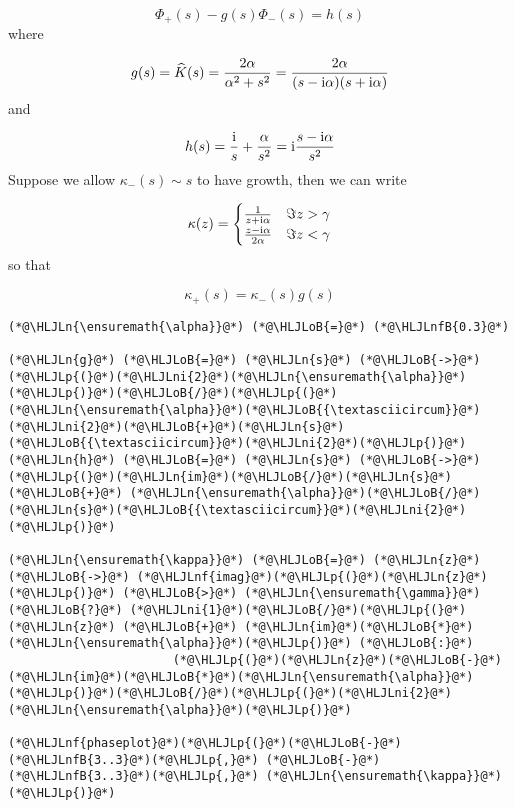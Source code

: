 \documentclass[12pt,landscape]{article}
\newcommand{\HLJLn}[1]{#1}
\newcommand{\HLJLnf}[1]{\textcolor[RGB]{66,102,213}{#1}}
\newcommand{\HLJLnfB}[1]{\textcolor[RGB]{59,151,46}{#1}}
\newcommand{\HLJLni}[1]{\textcolor[RGB]{59,151,46}{#1}}
\newcommand{\HLJLoB}[1]{\textcolor[RGB]{102,102,102}{\textbf{#1}}}
\newcommand{\HLJLp}[1]{#1}
\def\I{ {\rm i} }
\begin{document}
{\[
\Phi_+(s) - g(s) \Phi_-(s) = h(s)
\]
where

\[
g(s) = \widehat K(s) = {2\alpha \over \alpha^2 +s^2}= {2 \alpha \over (s-\I \alpha)(s+\I \alpha)}
\]
and

\[
h(s) = {\I \over s} + {\alpha \over s^2} = \I {s -\I \alpha \over s^2}
\]
Suppose we allow $\kappa_-(s) \sim s$ to have growth, then we can write

\[
\kappa(z) = \begin{cases} {1 \over z+\I \alpha }& \Im z > \gamma \\
                        {z-\I \alpha \over 2 \alpha} & \Im z < \gamma
\end{cases}
\]
so that

\[
\kappa_+(s) = \kappa_-(s) g(s)
\]

\begin{lstlisting}
(*@\HLJLn{\ensuremath{\alpha}}@*) (*@\HLJLoB{=}@*) (*@\HLJLnfB{0.3}@*)

(*@\HLJLn{g}@*) (*@\HLJLoB{=}@*) (*@\HLJLn{s}@*) (*@\HLJLoB{->}@*) (*@\HLJLp{(}@*)(*@\HLJLni{2}@*)(*@\HLJLn{\ensuremath{\alpha}}@*)(*@\HLJLp{)}@*)(*@\HLJLoB{/}@*)(*@\HLJLp{(}@*)(*@\HLJLn{\ensuremath{\alpha}}@*)(*@\HLJLoB{{\textasciicircum}}@*)(*@\HLJLni{2}@*)(*@\HLJLoB{+}@*)(*@\HLJLn{s}@*)(*@\HLJLoB{{\textasciicircum}}@*)(*@\HLJLni{2}@*)(*@\HLJLp{)}@*)
(*@\HLJLn{h}@*) (*@\HLJLoB{=}@*) (*@\HLJLn{s}@*) (*@\HLJLoB{->}@*) (*@\HLJLp{(}@*)(*@\HLJLn{im}@*)(*@\HLJLoB{/}@*)(*@\HLJLn{s}@*) (*@\HLJLoB{+}@*) (*@\HLJLn{\ensuremath{\alpha}}@*)(*@\HLJLoB{/}@*)(*@\HLJLn{s}@*)(*@\HLJLoB{{\textasciicircum}}@*)(*@\HLJLni{2}@*)(*@\HLJLp{)}@*)

(*@\HLJLn{\ensuremath{\kappa}}@*) (*@\HLJLoB{=}@*) (*@\HLJLn{z}@*) (*@\HLJLoB{->}@*) (*@\HLJLnf{imag}@*)(*@\HLJLp{(}@*)(*@\HLJLn{z}@*)(*@\HLJLp{)}@*) (*@\HLJLoB{>}@*) (*@\HLJLn{\ensuremath{\gamma}}@*) (*@\HLJLoB{?}@*) (*@\HLJLni{1}@*)(*@\HLJLoB{/}@*)(*@\HLJLp{(}@*)(*@\HLJLn{z}@*) (*@\HLJLoB{+}@*) (*@\HLJLn{im}@*)(*@\HLJLoB{*}@*)(*@\HLJLn{\ensuremath{\alpha}}@*)(*@\HLJLp{)}@*) (*@\HLJLoB{:}@*)
                       (*@\HLJLp{(}@*)(*@\HLJLn{z}@*)(*@\HLJLoB{-}@*)(*@\HLJLn{im}@*)(*@\HLJLoB{*}@*)(*@\HLJLn{\ensuremath{\alpha}}@*)(*@\HLJLp{)}@*)(*@\HLJLoB{/}@*)(*@\HLJLp{(}@*)(*@\HLJLni{2}@*)(*@\HLJLn{\ensuremath{\alpha}}@*)(*@\HLJLp{)}@*)

(*@\HLJLnf{phaseplot}@*)(*@\HLJLp{(}@*)(*@\HLJLoB{-}@*)(*@\HLJLnfB{3..3}@*)(*@\HLJLp{,}@*) (*@\HLJLoB{-}@*)(*@\HLJLnfB{3..3}@*)(*@\HLJLp{,}@*) (*@\HLJLn{\ensuremath{\kappa}}@*)(*@\HLJLp{)}@*)
\end{lstlisting}

}
\end{document}
